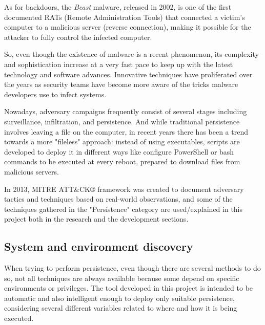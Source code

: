 As for backdoors, the \textit{Beast} malware, released in 2002, is one of the first documented RATs (Remote Administration Tools) that connected a victim's computer to a malicious server (reverse connection), making it possible for the attacker to fully control the infected computer.

So, even though the existence of malware is a recent phenomenon, its complexity and sophistication increase at a very fast pace to keep up with the latest technology and software advances. 
Innovative techniques have proliferated over the years as security teams have become more aware of the tricks malware developers use to infect systems. 

Nowadays, adversary campaigns frequently consist of several stages including surveillance, infiltration, and persistence. 
And while traditional persistence involves leaving a file on the computer, in recent years there has been a trend towards a more "fileless" approach: instead of using executables, scripts are developed to deploy it in different ways like configure PowerShell or bash commands\footnotemark{} to be executed at every reboot, prepared to download files from malicious servers.

In 2013, MITRE ATT\&CK®\cite{MitreWeb} framework was created to document adversary tactics and techniques based on real-world observations, and some of the techniques gathered in the "Persistence" category are used/explained in this project both in the research and the development sections. 

\subsection{System and environment discovery}
\label{ssec:recon}
When trying to perform persistence, even though there are several methods to do so, not all techniques are always available because some depend on specific environments or privileges. The tool developed in this project is intended to be automatic and also intelligent enough to deploy only suitable persistence, considering several different variables related to where and how it is being executed.

